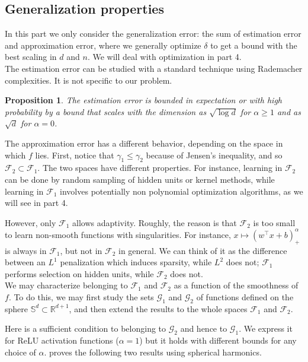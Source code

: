 \documentclass[a4paper, 11pt]{scrartcl}
\newtheorem{proposition}{Proposition}[section]
\begin{document}
\subsection{Generalization properties}

In this part we only consider the generalization error: the sum of estimation error and approximation error, where we generally optimize $\delta$ to get a bound with the best scaling in $d$ and $n$. We will deal with optimization in part 4.\\

The estimation error can be studied with a standard technique using Rademacher complexities. It is not specific to our problem.

\begin{proposition}
The estimation error is bounded in expectation or with high probability by a bound that scales with the dimension as $\sqrt{\log d}$ for $\alpha \geq 1$ and as $\sqrt{d}$ for $\alpha = 0$.
\end{proposition}

The approximation error has a different behavior, depending on the space in which $f$ lies. First, notice that $\gamma_1 \leq \gamma_2$ because of Jensen's inequality, and so $\mathcal{F}_2 \subset \mathcal{F}_1$. The two spaces have different properties. For instance, learning in $\mathcal{F}_2$ can be done by random sampling of hidden units or kernel methods, while learning in $\mathcal{F}_1$ involves potentially non polynomial optimization algorithms, as we will see in part 4.

However, only $\mathcal{F}_1$ allows adaptivity. Roughly, the reason is that $\mathcal{F}_2$ is too small to learn non-smooth functions with singularities. For instance, $x\mapsto (w^\top x+b)^\alpha_+$ is always in $\mathcal{F}_1$, but not in $\mathcal{F}_2$ in general. We can think of it as the difference between an $L^1$ penalization which induces sparsity, while $L^2$ does not; $\mathcal{F}_1$ performs selection on hidden units, while $\mathcal{F}_2$ does not.\\


We may characterize belonging to $\mathcal{F}_1$ and $\mathcal{F}_2$ as a function of the smoothness of $f$. To do this, we may first study the sets $\mathcal{G}_1$ and $\mathcal{G}_2$ of functions defined on the sphere $\mathbb{S}^d \subset \mathbb{R}^{d+1}$, and then extend the results to the whole spaces $\mathcal{F}_1$ and $\mathcal{F}_2$.

Here is a sufficient condition to belonging to $\mathcal{G}_2$ and hence to $\mathcal{G}_1$. We express it for ReLU activation functions ($\alpha=1$) but it holds with different bounds for any choice of $\alpha$. \cite{bach2017breaking} proves the following two results using spherical harmonics.
\end{document}

